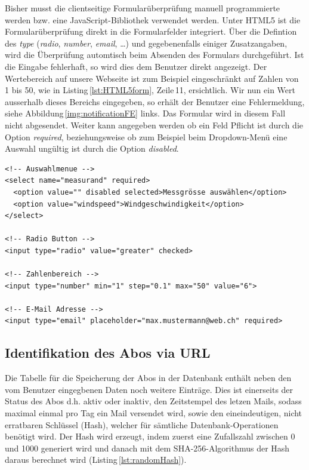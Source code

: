 \noindent
Bisher musst die clientseitige Formularüberprüfung manuell programmierte werden bzw. eine JavaScript-Bibliothek verwendet werden. Unter HTML5 ist die Formularüberprüfung direkt in die Formularfelder integriert. Über die Defintion des \emph{type} (\emph{radio}, \emph{number}, \emph{email}, \dots) und gegebenenfalls einiger Zusatzangaben, wird die Überprüfung automtisch beim Absenden des Formulars durchgeführt. Ist die Eingabe fehlerhaft, so wird dies dem Benutzer direkt angezeigt. Der Wertebereich auf unsere Webseite ist zum Beispiel eingeschränkt auf Zahlen von 1 bis 50, wie in Listing\,\ref{lst:HTML5form}, Zeile\,11, ersichtlich. Wir nun ein Wert ausserhalb dieses Bereichs eingegeben, so erhält der Benutzer eine Fehlermeldung, siehe Abbildung\,\ref{img:notificationFE} links. Das Formular wird in diesem Fall nicht abgesendet. Weiter kann angegeben werden ob ein Feld Pflicht ist durch die Option \emph{required}, beziehungsweise ob zum Beispiel beim Dropdown-Menü eine Auswahl ungültig ist durch die Option \emph{disabled}.

\vspace{3mm}
\begin{lstlisting}[label=lst:HTML5form,caption=Integrierte Formularüberprüfung mit HTML5, language=HTML5, style=htmlcssjs]
<!-- Auswahlmenue -->
<select name="measurand" required>
  <option value="" disabled selected>Messgrösse auswählen</option>
  <option value="windspeed">Windgeschwindigkeit</option>
</select>

<!-- Radio Button -->
<input type="radio" value="greater" checked>

<!-- Zahlenbereich -->
<input type="number" min="1" step="0.1" max="50" value="6">

<!-- E-Mail Adresse -->
<input type="email" placeholder="max.mustermann@web.ch" required>
\end{lstlisting}
\vspace{3mm}

\subsection{Identifikation des Abos via URL}
Die Tabelle für die Speicherung der Abos in der Datenbank enthält neben den vom Benutzer eingegbenen Daten noch weitere Einträge. Dies ist einerseits der Status des Abos d.h. aktiv oder inaktiv, den Zeitstempel des letzen Mails, sodass maximal einmal pro Tag ein Mail versendet wird, sowie den eineindeutigen, nicht erratbaren Schlüssel (Hash), welcher für sämtliche Datenbank-Operationen benötigt wird. Der Hash wird erzeugt, indem zuerst eine Zufallszahl zwischen 0 und 1000 generiert wird und danach mit dem SHA-256-Algorithmus der Hash daraus berechnet wird (Listing\,\ref{lst:randomHash}).


